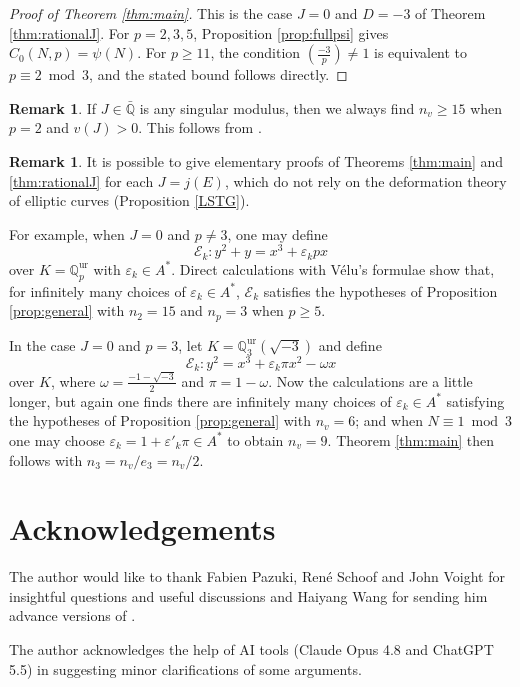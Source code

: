 \documentclass[11pt]{amsart}
\theoremstyle{definition}
\newtheorem{rem}[prop]{Remark}
\newcommand{\ur}{\mathrm{ur}}
\def\BQ{\mathbb{Q}}
\def\CE{\mathcal{E}}
\begin{document}
\begin{proof}[Proof of Theorem \ref{thm:main}]
	This is the case $J=0$ and $D=-3$ of Theorem \ref{thm:rationalJ}.
	For $p=2,3,5$, Proposition \ref{prop:fullpsi} gives
	$C_0(N,p)=\psi(N)$. For $p\geq 11$, the condition
	$\left(\frac{-3}{p}\right)\neq 1$ is equivalent to
	$p\equiv 2 \bmod 3$, and the stated bound follows directly.
\end{proof}

\begin{rem}
    If $J\in\bar{\BQ}$ is any singular modulus, then we always find $n_v \geq 15$ when $p=2$ and $v(J)>0$. This follows from \cite[Corollary 2.5]{GZ1985}.
\end{rem}

\begin{rem}
    It is possible to give elementary proofs of Theorems \ref{thm:main} and \ref{thm:rationalJ} for each $J=j(E)$, which do not rely on the deformation theory of elliptic curves (Proposition \ref{LSTG}).
    
    For example, when $J=0$ and $p\neq 3$, one may define
    \[
    \CE_k : y^2 + y = x^3 + \varepsilon_k p x
    \]
    over $K=\BQ_p^\ur$ with $\varepsilon_k\in A^*$. 
    Direct calculations with V\'elu's formulae show that, for infinitely many choices of $\varepsilon_k\in A^*$, $\CE_k$ satisfies the hypotheses of Proposition \ref{prop:general} with $n_2=15$ and $n_p = 3$ when $p\geq 5$.
    
    In the case $J=0$ and $p=3$, let $K=\BQ_3^\ur(\sqrt{-3})$ and define
    \[
    \CE_k : y^2 = x^3 + \varepsilon_k\pi x^2 - \omega x
    \]
    over $K$, where $\omega = \frac{-1-\sqrt{-3}}{2}$ and $\pi = 1-\omega$. 
    Now the calculations are a little longer, but again one finds there are infinitely many choices of $\varepsilon_k\in A^*$ satisfying the hypotheses of Proposition \ref{prop:general} with $n_v = 6$; and when $N \equiv 1 \bmod 3$ one may choose $\varepsilon_k = 1 + \varepsilon'_k\pi\in A^*$ to obtain $n_v=9$. Theorem \ref{thm:main} then follows with $n_3 = n_v/e_3 = n_v/2$.
\end{rem}

\section*{Acknowledgements}  
The author would like to thank Fabien Pazuki, Ren\'e Schoof and John Voight for insightful questions and useful discussions and Haiyang Wang for sending him advance versions of \cite{Wang-prep}.

The author acknowledges the help of AI tools (Claude Opus 4.8 and ChatGPT 5.5) in suggesting minor clarifications of some arguments.



\end{document}
